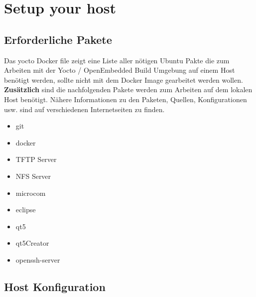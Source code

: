 \chapter{Setup your host}%
\label{cha:setup_host}


\section{Erforderliche Pakete}%
\label{sec:erforderliche_pakete}

Das yocto Docker file zeigt eine Liste aller nötigen Ubuntu Pakte die zum
Arbeiten mit der Yocto / OpenEmbedded Build Umgebung auf einem  Host benötigt
werden, sollte nicht mit dem Docker Image gearbeitet werden wollen. \\


\textbf{Zusätzlich} sind die nachfolgenden Pakete werden zum Arbeiten auf dem lokalen
Host benötigt. Nähere Informationen zu den Paketen, Quellen, Konfigurationen
usw. sind auf verschiedenen Internetseiten zu finden.

\begin{itemize}
    \item git
    \item docker
    \item TFTP Server
    \item NFS Server
    \item microcom
    \item eclipse
    \item qt5
    \item qt5Creator
    \item openssh-server
\end{itemize}

\section{Host Konfiguration}%
\label{sec:host_konfiguration}

